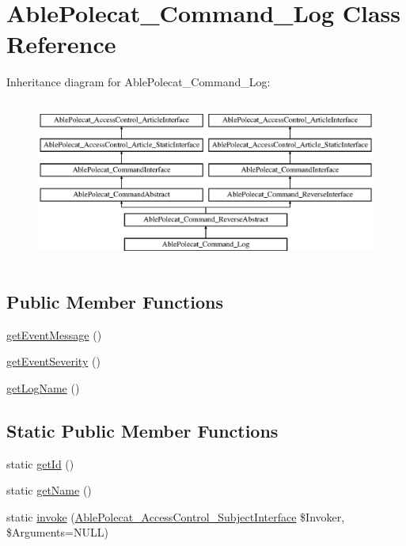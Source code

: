 \hypertarget{class_able_polecat___command___log}{}\section{Able\+Polecat\+\_\+\+Command\+\_\+\+Log Class Reference}
\label{class_able_polecat___command___log}
Inheritance diagram for Able\+Polecat\+\_\+\+Command\+\_\+\+Log\+:\begin{figure}[H]
\begin{center}
\leavevmode
\includegraphics[height=5.419355cm]{class_able_polecat___command___log}
\end{center}
\end{figure}
\subsection*{Public Member Functions}
\begin{DoxyCompactItemize}
\item 
\hyperlink{class_able_polecat___command___log_ac037ec24ef8efefd73088bf2c64730a2}{get\+Event\+Message} ()
\item 
\hyperlink{class_able_polecat___command___log_a92762a15bdf8e41aa188a9b262ab3e7e}{get\+Event\+Severity} ()
\item 
\hyperlink{class_able_polecat___command___log_a40172940a0af209c5b26a9f310cb6d04}{get\+Log\+Name} ()
\end{DoxyCompactItemize}
\subsection*{Static Public Member Functions}
\begin{DoxyCompactItemize}
\item 
static \hyperlink{class_able_polecat___command___log_acfaa3a96d0cb5a4c0d4d710dcba41e9e}{get\+Id} ()
\item 
static \hyperlink{class_able_polecat___command___log_a4ef9bd37ba3ce8a13c1e8bcf4f72a630}{get\+Name} ()
\item 
static \hyperlink{class_able_polecat___command___log_a6821480fe527af0afdf3691d7cffad5f}{invoke} (\hyperlink{interface_able_polecat___access_control___subject_interface}{Able\+Polecat\+\_\+\+Access\+Control\+\_\+\+Subject\+Interface} \$Invoker, \$Arguments=N\+U\+L\+L)
\end{DoxyCompactItemize}

